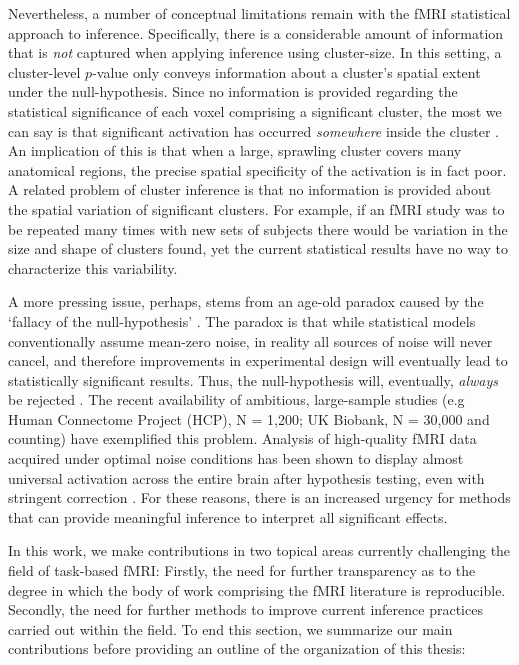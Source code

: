 Nevertheless, a number of conceptual limitations remain with the fMRI statistical approach to inference. Specifically, there is a considerable amount of information that is \textit{not} captured when applying inference using cluster-size. In this setting, a cluster-level $p$-value only conveys information about a cluster's spatial extent under the null-hypothesis. Since no information is provided regarding the statistical significance of each voxel comprising a significant cluster, the most we can say is that significant activation has occurred \textit{somewhere} inside the cluster \citep{Woo2014-ji}. An implication of this is that when a large, sprawling cluster covers many anatomical regions, the precise spatial specificity of the activation is in fact poor. A related problem of cluster inference is that no information is provided about the spatial variation of significant clusters. For example, if an fMRI study was to be repeated many times with new sets of subjects there would be variation in the size and shape of clusters found, yet the current statistical results have no way to characterize this variability.

A more pressing issue, perhaps, stems from an age-old paradox caused by the `fallacy of the null-hypothesis' \citep{Rozeboom1960-dp}. The paradox is that while statistical models conventionally assume mean-zero noise, in reality all sources of noise will never cancel, and therefore improvements in experimental design will eventually lead to statistically significant results. Thus, the null-hypothesis will, eventually, \textit{always} be rejected \citep{Meehl1967-ij}. The recent availability of ambitious, large-sample studies (e.g Human Connectome Project (HCP), N = 1,200; UK Biobank, N = 30,000 and counting) have exemplified this problem. Analysis of high-quality fMRI data acquired under optimal noise conditions has been shown to display almost universal activation across the entire brain after hypothesis testing, even with stringent correction \citep{Gonzalez-Castillo2012-do}. For these reasons, there is an increased urgency for methods that can provide meaningful inference to interpret all significant effects. 

\bigskip

\noindent In this work, we make contributions in two topical areas currently challenging the field of task-based fMRI: Firstly, the need for further transparency as to the degree in which the body of work comprising the fMRI literature is reproducible. Secondly, the need for further methods to improve current inference practices carried out within the field. To end this section, we summarize our main contributions before providing an outline of the organization of this thesis: 

